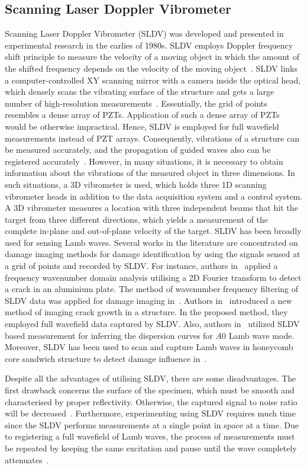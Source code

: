 \subsection{Scanning Laser Doppler Vibrometer} 
Scanning Laser Doppler Vibrometer (SLDV) was developed and presented in experimental research in the earlies of 1980s. 
SLDV employs Doppler frequency shift principle to measure the velocity of a moving object in which the amount of the shifted frequency depends on the velocity of the moving object~\cite{Stanbridge1999}. 
SLDV links a computer-controlled XY scanning mirror with a camera inside the optical head, which densely scans the vibrating surface of the structure and gets a large number of high-resolution measurements~\cite{Helfrick2011}. 
Essentially, the grid of points resembles a dense array of PZTs. 
Application of such a dense array of PZTs would be otherwise impractical.  
Hence, SLDV is employed for full wavefield measurements instead of PZT arrays. 
Consequently, vibrations of a structure can be measured accurately, and the propagation of guided waves also can be registered accurately~\cite{Ostachowicz2014}.
However, in many situations, it is necessary to obtain information about the vibrations of the measured object in three dimensions. 
In such situations, a 3D vibrometer is used, which holds three 1D scanning vibrometer heads in addition to the data acquisition system and a control system.
A 3D vibrometer measures a location with three independent beams that hit the target from three different directions, which yields a measurement of the complete in-plane and out-of-plane velocity of the target.
SLDV has been broadly used for sensing Lamb waves. 
Several works in the literature are concentrated on damage imaging methods for damage identification by using the signals sensed at a grid of points and recorded by SLDV.
For instance, authors in~\cite{Yu2013} applied a frequency wavenumber domain analysis utilising a 2D Fourier transform to detect a crack in an aluminium plate. 
The method of wavenumber frequency filtering of SLDV data was applied for damage imaging in~\cite{Ruzzene2007}. 
Authors in~\cite{Kudela2015} introduced a new method of imaging crack growth in a structure.
In the proposed method, they employed full wavefield data captured by SLDV.
Also, authors in~\cite{Harb2015} utilized SLDV based measurement for inferring the dispersion curves for \(A0\) Lamb wave mode. 
Moreover, SLDV has been used to scan and capture Lamb waves in honeycomb core sandwich structure to detect damage influence in~\cite{Lamboul2013}.

Despite all the advantages of utilising SLDV, there are some disadvantages. 
The first drawback concerns the surface of the specimen, which must be smooth and characterised by proper reflectivity. Otherwise, the captured signal to noise ratio will be decreased~\cite{Ostachowicz2014}. 
Furthermore, experimenting using  SLDV requires much time since the SLDV performs measurements at a single point in space at a time.
Due to registering a full wavefield of Lamb waves, the process of measurements must be repeated by keeping the same excitation and pause until the wave completely attenuates~\cite{Ostachowicz2014}.
